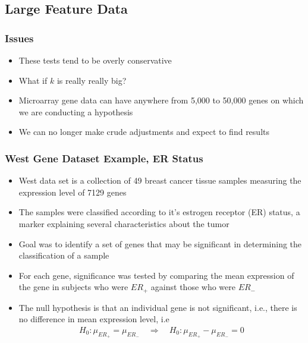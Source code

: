 \documentclass[11pt]{beamer}
\begin{document}
\subsection{Large Feature Data}

\begin{frame}
\frametitle{Issues}
{
\begin{itemize}
\item These tests tend to be overly conservative \\
\item What if $k$ is really really big?
\item Microarray gene data can have anywhere from 5,000 to 50,000 genes on which we are conducting a hypothesis
\item We can no longer make crude adjustments and expect to find results
\end{itemize}
}
\end{frame}

\begin{frame}
\frametitle{West Gene Dataset Example, ER Status}
{
\begin{itemize}
\item West data set is a collection of 49 breast cancer tissue samples measuring the expression level of 7129 genes \\
\item The samples were classified according to it's estrogen receptor (ER) status, a marker explaining several characteristics about the tumor \\
\item Goal was to identify a set of genes that may be significant in determining the classification of a sample \\
\item For each gene, significance was tested by comparing the mean expression of the gene in subjects who were $ER_+$ against those who were $ER_-$ \\
\item The null hypothesis is that an individual gene is not significant, i.e., there is no difference in mean expression level, i.e
\begin{align*}
H_0: \mu_{ER_+} = \mu_{ER_-} \quad \Rightarrow \quad H_0:  \mu_{ER_+} - \mu_{ER_-} = 0
\end{align*}
\end{itemize}
}
\end{frame}
\end{document}
